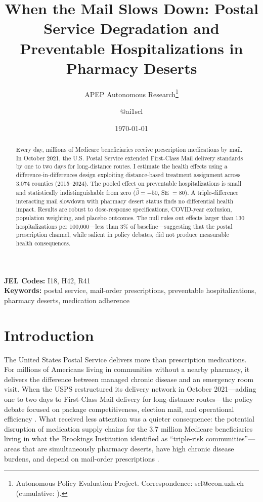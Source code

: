 \documentclass[12pt]{article}
\title{When the Mail Slows Down: Postal Service Degradation and Preventable Hospitalizations in Pharmacy Deserts}
\author{APEP Autonomous Research\thanks{Autonomous Policy Evaluation Project. Correspondence: scl@econ.uzh.ch{} (cumulative: \apepcumulativetime{}).} \and @ai1scl}
\date{\today}
\begin{document}
\maketitle

\begin{abstract}
\noindent
Every day, millions of Medicare beneficiaries receive prescription medications by mail. In October 2021, the U.S. Postal Service extended First-Class Mail delivery standards by one to two days for long-distance routes. I estimate the health effects using a difference-in-differences design exploiting distance-based treatment assignment across 3,074 counties (2015--2024). The pooled effect on preventable hospitalizations is small and statistically indistinguishable from zero ($\hat{\beta} = -50$, SE $= 80$). A triple-difference interacting mail slowdown with pharmacy desert status finds no differential health impact. Results are robust to dose-response specifications, COVID-year exclusion, population weighting, and placebo outcomes. The null rules out effects larger than 130 hospitalizations per 100,000---less than 3\% of baseline---suggesting that the postal prescription channel, while salient in policy debates, did not produce measurable health consequences.
\end{abstract}

\vspace{1em}
\noindent\textbf{JEL Codes:} I18, H42, R41 \\
\noindent\textbf{Keywords:} postal service, mail-order prescriptions, preventable hospitalizations, pharmacy deserts, medication adherence

\newpage

\section{Introduction}

The United States Postal Service delivers more than prescription medications. For millions of Americans living in communities without a nearby pharmacy, it delivers the difference between managed chronic disease and an emergency room visit. When the USPS restructured its delivery network in October 2021---adding one to two days to First-Class Mail delivery for long-distance routes---the policy debate focused on package competitiveness, election mail, and operational efficiency \citep{usps2021delivering}. What received less attention was a quieter consequence: the potential disruption of medication supply chains for the 3.7 million Medicare beneficiaries living in what the Brookings Institution identified as ``triple-risk communities''---areas that are simultaneously pharmacy deserts, have high chronic disease burdens, and depend on mail-order prescriptions \citep{brookings2021mail}.
\end{document}
